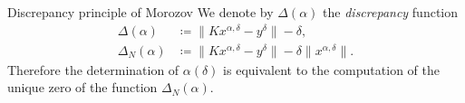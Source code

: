 \documentclass[10pt,xcolor={dvipsnames}]{beamer}
\newtheorem{proposition}[subsection]{Proposition}
\theoremstyle{plain}
\theoremstyle{plain}
\begin{document}
\begin{frame}
{\begin{columns}[t]
 \begin{column}{0.5\textwidth}
 \begin{block}{Discrepancy principle of Morozov}
 \footnotesize
 We denote by $\Delta(\alpha)$ the \emph{discrepancy} function
 \begin{align}
  \Delta(\alpha)&\coloneqq\|Kx^{\alpha,\delta} - y^\delta\| - \delta, \label{eq:def-disc}\\
  \Delta_N(\alpha)&\coloneqq\|Kx^{\alpha,\delta} - y^\delta\| - \delta\|x^{\alpha,\delta}\|.\label{eq:def-disc-N}
 \end{align}
Therefore the determination of $\alpha(\delta)$ is equivalent to the computation 
of the unique zero of the function $\Delta_N(\alpha)$.
 \end{block}
 \end{column}
\end{columns}
}
\end{frame}
\end{document}
